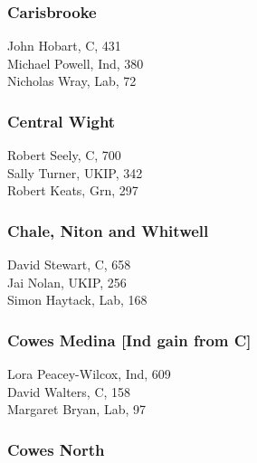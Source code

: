 \documentclass[a4paper,openany,10pt]{book}
\begin{document}
\subsubsection*{Carisbrooke}



John Hobart, C, 431\\
Michael Powell, Ind, 380\\
Nicholas Wray, Lab, 72\\


\subsubsection*{Central Wight}



Robert Seely, C, 700\\
Sally Turner, UKIP, 342\\
Robert Keats, Grn, 297\\


\subsubsection*{Chale, Niton and Whitwell}



David Stewart, C, 658\\
Jai Nolan, UKIP, 256\\
Simon Haytack, Lab, 168\\


\subsubsection*{Cowes Medina \hspace*{\fill}\nolinebreak[1]%
\enspace\hspace*{\fill}
[Ind gain from C]}



Lora Peacey-Wilcox, Ind, 609\\
David Walters, C, 158\\
Margaret Bryan, Lab, 97\\


\subsubsection*{Cowes North}
\end{document}
